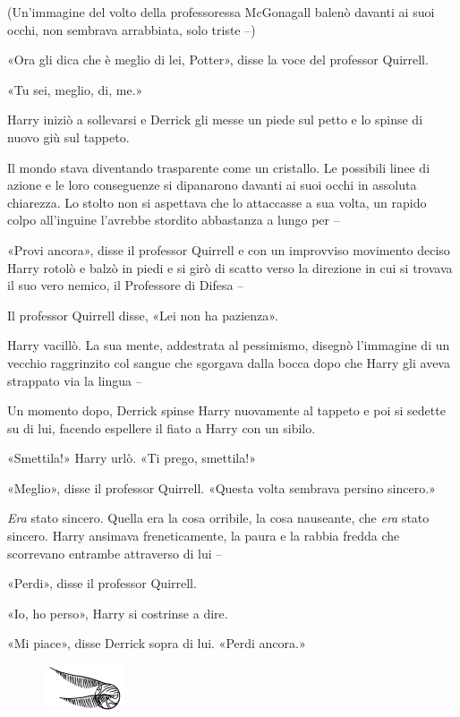 (Un’immagine del volto della professoressa McGonagall balenò davanti ai suoi occhi, non sembrava arrabbiata, solo triste –)

«Ora gli dica che è meglio di lei, Potter», disse la voce del professor Quirrell.

«Tu sei, meglio, di, me.»

Harry iniziò a sollevarsi e Derrick gli messe un piede sul petto e lo spinse di nuovo giù sul tappeto.

Il mondo stava diventando trasparente come un cristallo. Le possibili linee di azione e le loro conseguenze si dipanarono davanti ai suoi occhi in assoluta chiarezza. Lo stolto non si aspettava che lo attaccasse a sua volta, un rapido colpo all’inguine l’avrebbe stordito abbastanza a lungo per –

«Provi ancora», disse il professor Quirrell e con un improvviso movimento deciso Harry rotolò e balzò in piedi e si girò di scatto verso la direzione in cui si trovava il suo vero nemico, il Professore di Difesa –

Il professor Quirrell disse, «Lei non ha pazienza».

Harry vacillò. La sua mente, addestrata al pessimismo, disegnò l’immagine di un vecchio raggrinzito col sangue che sgorgava dalla bocca dopo che Harry gli aveva strappato via la lingua –

Un momento dopo, Derrick spinse Harry nuovamente al tappeto e poi si sedette su di lui, facendo espellere il fiato a Harry con un sibilo.

«Smettila!» Harry urlò. «Ti prego, smettila!»

«Meglio», disse il professor Quirrell. «Questa volta sembrava persino sincero.»

\textit{Era} stato sincero. Quella era la cosa orribile, la cosa nauseante, che \textit{era} stato sincero. Harry ansimava freneticamente, la paura e la rabbia fredda che scorrevano entrambe attraverso di lui –

«Perdi», disse il professor Quirrell.

«Io, ho perso», Harry si costrinse a dire.

«Mi piace», disse Derrick sopra di lui. «Perdi ancora.»

\begin{figure}[h!]
        \includegraphics[scale=0.4]{boccino.png}
        \centering
\end{figure}

